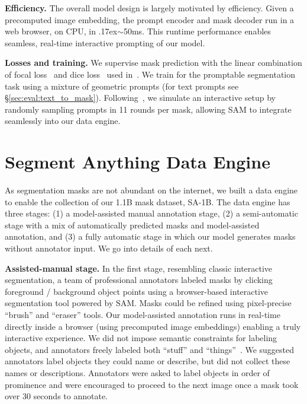 \documentclass[10pt,twocolumn,letterpaper]{article}
\renewcommand{\paragraph}[1]{\vspace{1.25mm}\noindent\textbf{#1}}
\newcommand{\app}{\raise.17ex\hbox{$\scriptstyle\sim$}}
\newcommand{\sad}{\mbox{SA-1B}\xspace}
\newcommand{\sam}{SAM\xspace}
\begin{document}
\paragraph{Efficiency.} The overall model design is largely motivated by efficiency. Given a precomputed image embedding, the prompt encoder and mask decoder run in a web browser, on CPU, in \app50ms. This runtime performance enables seamless, real-time interactive prompting of our model.

\paragraph{Losses and training.} We supervise mask prediction with the linear combination of focal loss~\cite{Lin2017a} and dice loss~\cite{milletari2016v} used in~\cite{Carion2020}. We train for the promptable segmentation task using a mixture of geometric prompts (for text prompts see \S\ref{sec:eval:text_to_mask}). Following~\cite{sofiiuk2022reviving,forte2020getting}, we simulate an interactive setup by randomly sampling prompts in 11 rounds per mask, allowing \sam to integrate seamlessly into our data engine.

\section{Segment Anything Data Engine}\label{sec:engine}

As segmentation masks are not abundant on the internet, we built a data engine to enable the collection of our 1.1B mask dataset, \sad. The data engine has three stages: (1) a model-assisted manual annotation stage, (2) a semi-automatic stage with a mix of automatically predicted masks and model-assisted annotation, and (3) a fully automatic stage in which our model generates masks without annotator input. We go into details of each next.

\paragraph{Assisted-manual stage.} In the first stage, resembling classic interactive segmentation, a team of professional annotators labeled masks by clicking foreground / background object points using a browser-based interactive segmentation tool powered by \sam. Masks could be refined using pixel-precise ``brush'' and ``eraser'' tools. Our model-assisted annotation runs in real-time directly inside a browser (using precomputed image embeddings) enabling a truly interactive experience. We did not impose semantic constraints for labeling objects, and annotators freely labeled both ``stuff'' and ``things''~\cite{adelson2001seeing}. We suggested annotators label objects they could name or describe, but did not collect these names or descriptions. Annotators were asked to label objects in order of prominence and were encouraged to proceed to the next image once a mask took over 30 seconds to annotate.
\end{document}
